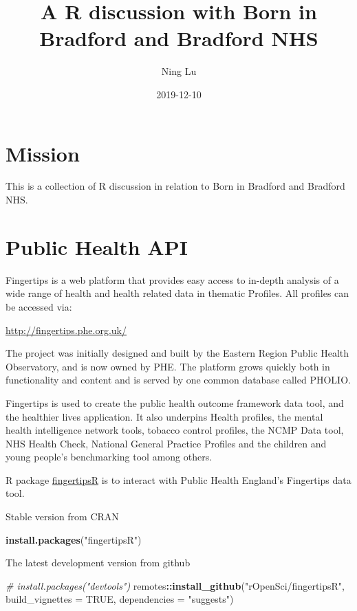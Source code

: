 \documentclass[]{book}
\title{A R discussion with Born in Bradford and Bradford NHS}
\author{Ning Lu}
\date{2019-12-10}
\newenvironment{Shaded}{\begin{snugshade}}{\end{snugshade}}
\newcommand{\CommentTok}[1]{\textcolor[rgb]{0.56,0.35,0.01}{\textit{#1}}}
\newcommand{\DataTypeTok}[1]{\textcolor[rgb]{0.13,0.29,0.53}{#1}}
\newcommand{\KeywordTok}[1]{\textcolor[rgb]{0.13,0.29,0.53}{\textbf{#1}}}
\newcommand{\NormalTok}[1]{#1}
\newcommand{\OperatorTok}[1]{\textcolor[rgb]{0.81,0.36,0.00}{\textbf{#1}}}
\newcommand{\OtherTok}[1]{\textcolor[rgb]{0.56,0.35,0.01}{#1}}
\newcommand{\StringTok}[1]{\textcolor[rgb]{0.31,0.60,0.02}{#1}}
\begin{document}
\maketitle

{
\setcounter{tocdepth}{1}
\tableofcontents
}
\hypertarget{mission}{%
\chapter{Mission}\label{mission}}

This is a collection of R discussion in relation to Born in Bradford and Bradford NHS.

\hypertarget{public-health-api}{%
\chapter{Public Health API}\label{public-health-api}}

Fingertips is a web platform that provides easy access to in-depth analysis of a wide range of health and health related data in thematic Profiles. All profiles can be accessed via:

\url{http://fingertips.phe.org.uk/}

The project was initially designed and built by the Eastern Region Public Health Observatory, and is now owned by PHE. The platform grows quickly both in functionality and content and is served by one common database called PHOLIO.

Fingertips is used to create the public health outcome framework data tool, and the healthier lives application. It also underpins Health profiles, the mental health intelligence network tools, tobacco control profiles, the NCMP Data tool, NHS Health Check, National General Practice Profiles and the children and young people's benchmarking tool among others.

R package \href{https://github.com/ropensci/fingertipsR}{fingertipsR} is to interact with Public Health England's Fingertips data tool.

Stable version from CRAN

\begin{Shaded}
\begin{Highlighting}[]
\KeywordTok{install.packages}\NormalTok{(}\StringTok{"fingertipsR"}\NormalTok{)}
\end{Highlighting}
\end{Shaded}

The latest development version from github

\begin{Shaded}
\begin{Highlighting}[]
\CommentTok{# install.packages("devtools")}
\NormalTok{remotes}\OperatorTok{::}\KeywordTok{install_github}\NormalTok{(}\StringTok{"rOpenSci/fingertipsR"}\NormalTok{,}
                        \DataTypeTok{build_vignettes =} \OtherTok{TRUE}\NormalTok{,}
                        \DataTypeTok{dependencies =} \StringTok{"suggests"}\NormalTok{)}
\end{Highlighting}
\end{Shaded}
\end{document}
